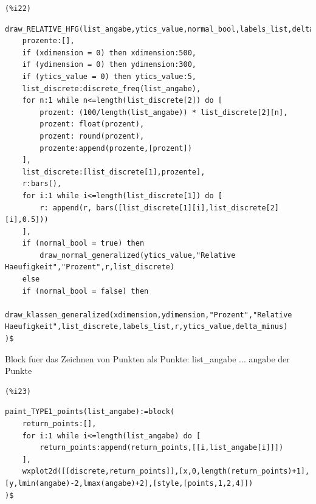 \documentclass[12pt]{article}
\begin{document}
\noindent
\begin{minipage}[t]{8ex}{\color{red}\bf
\begin{verbatim}
(%i22) 
\end{verbatim}}
\end{minipage}
\begin{minipage}[t]{\textwidth}{\color{blue}
\begin{verbatim}
draw_RELATIVE_HFG(list_angabe,ytics_value,normal_bool,labels_list,delta_minus,xdimension,ydimension):=block(
    prozente:[],
    if (xdimension = 0) then xdimension:500,
    if (ydimension = 0) then ydimension:300,
    if (ytics_value = 0) then ytics_value:5,
    list_discrete:discrete_freq(list_angabe),
    for n:1 while n<=length(list_discrete[2]) do [
        prozent: (100/length(list_angabe)) * list_discrete[2][n],
        prozent: float(prozent),
        prozent: round(prozent),
        prozente:append(prozente,[prozent])
    ],
    list_discrete:[list_discrete[1],prozente],
    r:bars(),
    for i:1 while i<=length(list_discrete[1]) do [
        r: append(r, bars([list_discrete[1][i],list_discrete[2][i],0.5]))
    ],
    if (normal_bool = true) then
        draw_normal_generalized(ytics_value,"Relative Haeufigkeit","Prozent",r,list_discrete)    
    else
    if (normal_bool = false) then
        draw_klassen_generalized(xdimension,ydimension,"Prozent","Relative Haeufigkeit",list_discrete,labels_list,r,ytics_value,delta_minus)
)$
\end{verbatim}}
\end{minipage}

Block fuer das Zeichnen von Punkten als Punkte:
    list\_angabe ... angabe der Punkte

\noindent
\begin{minipage}[t]{8ex}{\color{red}\bf
\begin{verbatim}
(%i23) 
\end{verbatim}}
\end{minipage}
\begin{minipage}[t]{\textwidth}{\color{blue}
\begin{verbatim}
paint_TYPE1_points(list_angabe):=block(
    return_points:[],
    for i:1 while i<=length(list_angabe) do [
        return_points:append(return_points,[[i,list_angabe[i]]])
    ],
    wxplot2d([[discrete,return_points]],[x,0,length(return_points)+1],[y,lmin(angabe)-2,lmax(angabe)+2],[style,[points,1,2,4]]) 
)$
\end{verbatim}}
\end{minipage}
\end{document}
